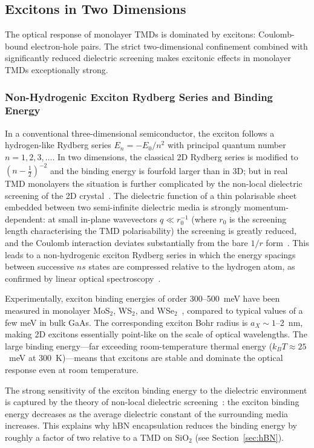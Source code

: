 \subsection{Excitons in Two Dimensions}
\label{sub:chapKeyWord__subsection_2_4}

The optical response of monolayer TMDs is dominated by excitons: Coulomb-bound electron-hole pairs.
The strict two-dimensional confinement combined with significantly reduced dielectric screening makes excitonic effects in monolayer TMDs exceptionally strong.

\subsubsection{Non-Hydrogenic Exciton Rydberg Series and Binding Energy}

In a conventional three-dimensional semiconductor, the exciton follows a hydrogen-like Rydberg series $E_n = -E_0/n^2$ with principal quantum number $n = 1, 2, 3, \ldots$.
In two dimensions, the classical 2D Rydberg series is modified to $(n-\tfrac{1}{2})^{-2}$ and the binding energy is fourfold larger than in 3D; but in real TMD monolayers the situation is further complicated by the non-local dielectric screening of the 2D crystal~\cite{chernikov-2014}.
The dielectric function of a thin polarisable sheet embedded between two semi-infinite dielectric media is strongly momentum-dependent: at small in-plane wavevectors $q \ll r_0^{-1}$ (where $r_0$ is the screening length characterising the TMD polarisability) the screening is greatly reduced, and the Coulomb interaction deviates substantially from the bare $1/r$ form~\cite{chernikov-2014}.
This leads to a non-hydrogenic exciton Rydberg series in which the energy spacings between successive $ns$ states are compressed relative to the hydrogen atom, as confirmed by linear optical spectroscopy~\cite{chernikov-2014}.

Experimentally, exciton binding energies of order 300--500~meV have been measured in monolayer MoS$_2$, WS$_2$, and WSe$_2$~\cite{chernikov-2014}, compared to typical values of a few meV in bulk GaAs.
The corresponding exciton Bohr radius is $a_X \sim 1$--2~nm, making 2D excitons essentially point-like on the scale of optical wavelengths.
The large binding energy---far exceeding room-temperature thermal energy ($k_BT \approx 25$~meV at 300~K)---means that excitons are stable and dominate the optical response even at room temperature.

The strong sensitivity of the exciton binding energy to the dielectric environment is captured by the theory of non-local dielectric screening~\cite{raja-2017}: the exciton binding energy decreases as the average dielectric constant of the surrounding media increases.
This explains why hBN encapsulation reduces the binding energy by roughly a factor of two relative to a TMD on SiO$_2$ (see Section~\ref{sec:hBN}).


